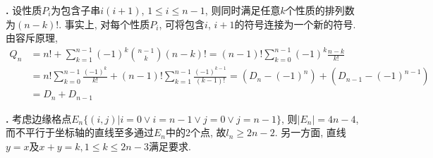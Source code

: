 \par \textbf{\thesolenum .} 设性质$P_i$为包含子串$i(i+1)$, $1\le i\le n-1$, 则同时满足任意$k$个性质的排列数为$(n-k)!$. 事实上, 对每个性质$P_i$, 可将包含$i$, $i+1$的符号连接为一个新的符号. 由容斥原理,
\begin{align*}
    Q_n &= n! + \sum_{k=1}^{n-1} (-1)^k \binom{n-1}{k} (n-k)! 
    = (n-1)! \sum_{k=0}^{n-1} (-1)^k  \frac{n-k}{k!}\\
    &= n! \sum_{k=0}^{n-1}\frac{(-1)^k}{k!} + (n-1)! \sum_{k=1}^{n-1}\frac{(-1)^{k-1}}{(k-1)!}
    = (D_n - (-1)^n) + (D_{n-1} - (-1)^{n-1})\\
    &= D_n + D_{n-1}
\end{align*}

\par \textbf{\thesolenum .} \cite{MaP} 考虑边缘格点$E_n\{(i,j)\vert i=0 \lor i=n-1 \lor j=0 \lor j=n-1\}$, 则$|E_n|=4n-4$, 而不平行于坐标轴的直线至多通过$E_n$中的2个点, 故$l_n\ge 2n-2$. 另一方面, 直线$y=x$及$x+y=k, 1\le k\le 2n-3$满足要求. 